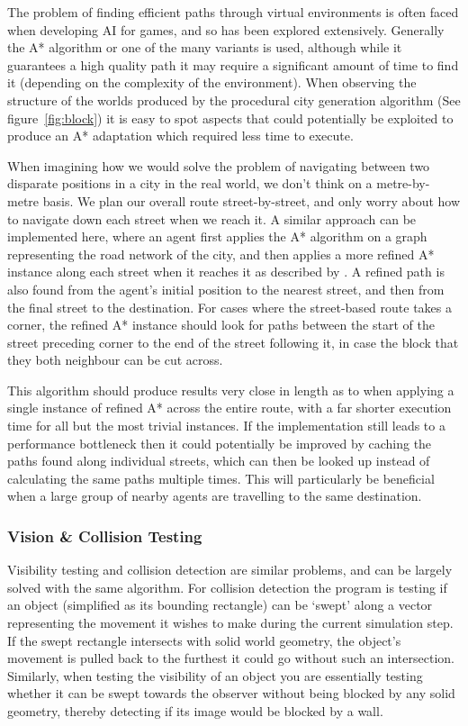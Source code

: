 \documentclass[12pt,a4paper]{article}
\begin{document}
The problem of finding efficient paths through virtual environments is often faced when developing AI for games, and so has been explored extensively. Generally the A* algorithm \cite{bulitko10} or one of the many variants is used, although while it guarantees a high quality path it may require a significant amount of time to find it (depending on the complexity of the environment). When observing the structure of the worlds produced by the procedural city generation algorithm (See figure~\ref{fig:block}) it is easy to spot aspects that could potentially be exploited to produce an A* adaptation which required less time to execute.

When imagining how we would solve the problem of navigating between two disparate positions in a city in the real world, we don't think on a metre-by-metre basis. We plan our overall route street-by-street, and only worry about how to navigate down each street when we reach it. A similar approach can be implemented here, where an agent first applies the A* algorithm on a graph representing the road network of the city, and then applies a more refined A* instance along each street when it reaches it as described by  \citeyear{buro05}. A refined path is also found from the agent's initial position to the nearest street, and then from the final street to the destination. For cases where the street-based route takes a corner, the refined A* instance should look for paths between the start of the street preceding corner to the end of the street following it, in case the block that they both neighbour can be cut across.

This algorithm should produce results very close in length as to when applying a single instance of refined A* across the entire route, with a far shorter execution time for all but the most trivial instances. If the implementation still leads to a performance bottleneck then it could potentially be improved by caching the paths found along individual streets, which can then be looked up instead of calculating the same paths multiple times. This will particularly be beneficial when a large group of nearby agents are travelling to the same destination.

\subsubsection{Vision \& Collision Testing}\noindent
Visibility testing and collision detection are similar problems, and can be largely solved with the same algorithm. For collision detection the program is testing if an object (simplified as its bounding rectangle)
can be `swept' along a vector representing the movement it wishes to make during the current simulation step. If the swept rectangle intersects with solid world geometry, the object's movement is pulled back to the furthest it could go without such an intersection. Similarly, when testing the visibility of an object you are essentially testing whether it can be swept towards the observer without being blocked by any solid geometry, thereby detecting if its image would be blocked by a wall.
\end{document}
